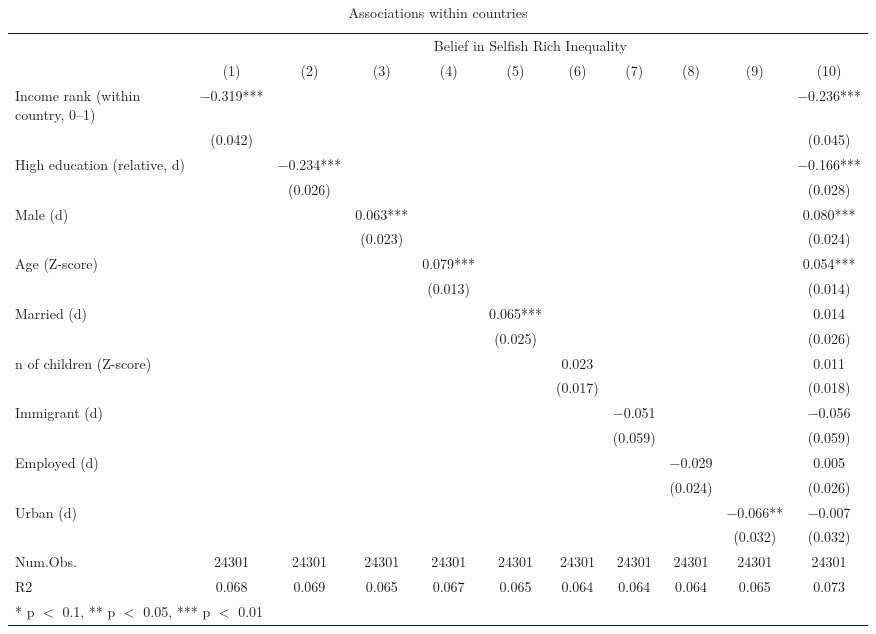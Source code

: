 \begin{table}

\caption{\label{tab:unnamed-chunk-48}Associations within countries}
\centering
\begin{tabular}[t]{lcccccccccc}
\toprule
\multicolumn{1}{c}{ } & \multicolumn{10}{c}{Belief in Selfish Rich Inequality} \\
\cmidrule(l{3pt}r{3pt}){2-11}
  & (1) & (2) & (3) & (4) & (5) & (6) & (7) & (8) & (9) & (10)\\
\midrule
Income rank (within country, 0--1) & \num{-0.319}*** &  &  &  &  &  &  &  &  & \num{-0.236}***\\
 & (\num{0.042}) &  &  &  &  &  &  &  &  & (\num{0.045})\\
High education (relative, d) &  & \num{-0.234}*** &  &  &  &  &  &  &  & \num{-0.166}***\\
 &  & (\num{0.026}) &  &  &  &  &  &  &  & (\num{0.028})\\
Male (d) &  &  & \num{0.063}*** &  &  &  &  &  &  & \num{0.080}***\\
 &  &  & (\num{0.023}) &  &  &  &  &  &  & (\num{0.024})\\
Age (Z-score) &  &  &  & \num{0.079}*** &  &  &  &  &  & \num{0.054}***\\
 &  &  &  & (\num{0.013}) &  &  &  &  &  & (\num{0.014})\\
Married (d) &  &  &  &  & \num{0.065}*** &  &  &  &  & \num{0.014}\\
 &  &  &  &  & (\num{0.025}) &  &  &  &  & (\num{0.026})\\
n of children (Z-score) &  &  &  &  &  & \num{0.023} &  &  &  & \num{0.011}\\
 &  &  &  &  &  & (\num{0.017}) &  &  &  & (\num{0.018})\\
Immigrant (d) &  &  &  &  &  &  & \num{-0.051} &  &  & \num{-0.056}\\
 &  &  &  &  &  &  & (\num{0.059}) &  &  & (\num{0.059})\\
Employed (d) &  &  &  &  &  &  &  & \num{-0.029} &  & \num{0.005}\\
 &  &  &  &  &  &  &  & (\num{0.024}) &  & (\num{0.026})\\
Urban (d) &  &  &  &  &  &  &  &  & \num{-0.066}** & \num{-0.007}\\
 &  &  &  &  &  &  &  &  & (\num{0.032}) & (\num{0.032})\\
\midrule
Num.Obs. & \num{24301} & \num{24301} & \num{24301} & \num{24301} & \num{24301} & \num{24301} & \num{24301} & \num{24301} & \num{24301} & \num{24301}\\
R2 & \num{0.068} & \num{0.069} & \num{0.065} & \num{0.067} & \num{0.065} & \num{0.064} & \num{0.064} & \num{0.064} & \num{0.065} & \num{0.073}\\
\bottomrule
\multicolumn{11}{l}{\rule{0pt}{1em}* p $<$ 0.1, ** p $<$ 0.05, *** p $<$ 0.01}\\
\end{tabular}
\end{table}